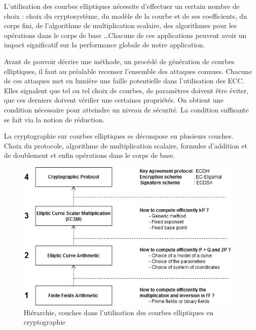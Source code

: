 L'utilisation des courbes elliptiques nécessite d'effectuer un certain nombre de choix : choix du cryptosystème, du modèle de la courbe et de ses coefficients, du corps fini, de l'algorithme de multiplication scalaire, des algorithmes pour les opérations dans le corps de base \ldots Chacune de ces applications peuvent avoir un impact significatif sur la performance globale de notre application.

Avant de pouvoir décrire une méthode, un procédé de génération de courbes elliptiques, il faut au préalable recenser l'ensemble des attaques connues. Chacune de ces attaques met en lumière une faille potentielle dans l'utilisation des ECC. Elles signalent que tel ou tel choix de courbes, de paramètres doivent être éviter, que ces derniers doivent vérifier une certaines propriétés. On obtient une condition nécessaire pour atteindre un niveau de sécurité. La condition suffisante se fait via la notion de réduction.

La cryptographie sur courbes elliptiques se décompose en plusieurs couches. Choix du protocole, algorithme de multiplication scalaire, formules d'addition et de doublement et enfin opérations dans le corps de base. 

\begin{figure}[ht]
    \centering
    \includegraphics[scale=0.7]{images/ECC_level.png}
    \caption{Hiérarchie, couches dans l'utilisation des courbes elliptiques en cryptographie}
    \label{fig:my_label}
\end{figure}
\FloatBarrier

